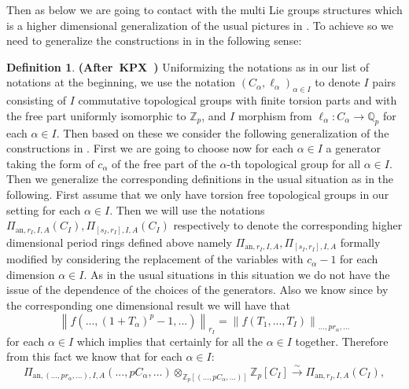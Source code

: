\documentclass[12pt]{amsart}
\theoremstyle{definition}
\newtheorem{definition}[theorem]{Definition}
\numberwithin{equation}{section}
\begin{document}
\indent Then as below we are going to contact with the multi Lie groups structures which is a higher dimensional generalization of the usual pictures in \cite[Definition 2.1.20]{KPX}. To achieve so we need to generalize the constructions in \cite[Definition 2.1.20]{KPX} in the following sense:



\begin{definition} \mbox{\bf{(After KPX \cite[Definition 2.1.20]{KPX})}} \label{definition1}
Uniformizing the notations as in our list of notations at the beginning, we use the notation $(C_\alpha,\ell_\alpha)_{\alpha\in I}$ to denote $I$ pairs consisting of $I$ commutative topological groups with finite torsion parts and with the free part uniformly isomorphic to $\mathbb{Z}_p$, and $I$ morphism from $\ell_\alpha:C_\alpha\rightarrow \mathbb{Q}_p$ for each $\alpha\in I$. Then based on these we consider the following generalization of the constructions in \cite[Definition 2.1.20]{KPX}. First we are going to choose now for each $\alpha\in I$ a generator taking the form of $c_\alpha$ of the free part of the $\alpha$-th topological group for all $\alpha\in I$. Then we generalize the corresponding definitions in the usual situation as in the following. First assume that we only have torsion free topological groups in our setting for each $\alpha\in I$. Then we will use the notations $\Pi_{\mathrm{an},r_{I},I,A}(C_I),\Pi_{[s_I,r_I],I,A}(C_I)$ respectively to denote the corresponding higher dimensional period rings defined above namely $\Pi_{\mathrm{an},r_{I},I,A},\Pi_{[s_I,r_I],I,A}$ formally modified by considering the replacement of the variables with $c_\alpha-1$ for each dimension $\alpha\in I$. As in the usual situations in this situation we do not have the issue of the dependence of the choices of the generators. Also we know since by the corresponding one dimensional result we will have that
\begin{displaymath}
\left\|f(...,(1+T_\alpha)^p-1,...)\right\|_{r_I}=\left\|f(T_1,...,T_I)\right\|_{...,pr_\alpha,...}
\end{displaymath} 
for each $\alpha\in I$ which implies that certainly for all the $\alpha\in I$ together. Therefore from this fact we know that for each $\alpha\in I$:
\begin{displaymath}
\Pi_{\mathrm{an},(...,pr_{\alpha},...),I,A}(...,pC_\alpha,...)\otimes_{\mathbb{Z}_p[(...,pC_\alpha,...)]}	\mathbb{Z}_p[C_I]\overset{\sim}{\rightarrow} \Pi_{\mathrm{an},r_{I},I,A}(C_I),
\end{displaymath}

\end{definition}
\end{document}

